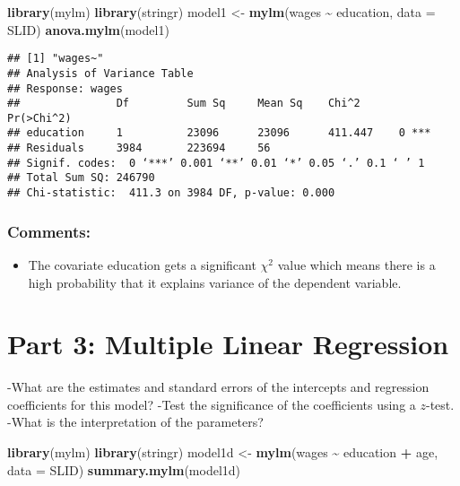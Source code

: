 \documentclass[
]{article}
\newenvironment{Shaded}{\begin{snugshade}}{\end{snugshade}}
\newcommand{\AttributeTok}[1]{\textcolor[rgb]{0.13,0.29,0.53}{#1}}
\newcommand{\FunctionTok}[1]{\textcolor[rgb]{0.13,0.29,0.53}{\textbf{#1}}}
\newcommand{\NormalTok}[1]{#1}
\newcommand{\OtherTok}[1]{\textcolor[rgb]{0.56,0.35,0.01}{#1}}
\newcommand{\SpecialCharTok}[1]{\textcolor[rgb]{0.81,0.36,0.00}{\textbf{#1}}}
\providecommand{\tightlist}{%
  \setlength{\itemsep}{0pt}\setlength{\parskip}{0pt}}
\begin{document}
\begin{Shaded}
\begin{Highlighting}[]
\FunctionTok{library}\NormalTok{(mylm)}
\FunctionTok{library}\NormalTok{(stringr)}
\NormalTok{model1 }\OtherTok{\textless{}{-}} \FunctionTok{mylm}\NormalTok{(wages }\SpecialCharTok{\textasciitilde{}}\NormalTok{ education, }\AttributeTok{data =}\NormalTok{ SLID)}
\FunctionTok{anova.mylm}\NormalTok{(model1)}
\end{Highlighting}
\end{Shaded}

\begin{verbatim}
## [1] "wages~"
## Analysis of Variance Table
## Response: wages
##               Df         Sum Sq     Mean Sq    Chi^2      Pr(>Chi^2) 
## education     1          23096      23096      411.447    0 ***      
## Residuals     3984       223694     56        
## Signif. codes:  0 ‘***’ 0.001 ‘**’ 0.01 ‘*’ 0.05 ‘.’ 0.1 ‘ ’ 1
## Total Sum SQ: 246790 
## Chi-statistic:  411.3 on 3984 DF, p-value: 0.000
\end{verbatim}

\hypertarget{comments-1}{%
\subsubsection{Comments:}\label{comments-1}}

\begin{itemize}
\tightlist
\item
  The covariate education gets a significant \(\chi^2\) value which
  means there is a high probability that it explains variance of the
  dependent variable.
\end{itemize}

\hypertarget{part-3-multiple-linear-regression}{%
\section{Part 3: Multiple Linear
Regression}\label{part-3-multiple-linear-regression}}

-What are the estimates and standard errors of the intercepts and
regression coefficients for this model? -Test the significance of the
coefficients using a \(z\)-test. -What is the interpretation of the
parameters?

\begin{Shaded}
\begin{Highlighting}[]
\FunctionTok{library}\NormalTok{(mylm)}
\FunctionTok{library}\NormalTok{(stringr)}
\NormalTok{model1d }\OtherTok{\textless{}{-}} \FunctionTok{mylm}\NormalTok{(wages }\SpecialCharTok{\textasciitilde{}}\NormalTok{ education }\SpecialCharTok{+}\NormalTok{ age, }\AttributeTok{data =}\NormalTok{ SLID)}
\FunctionTok{summary.mylm}\NormalTok{(model1d)}
\end{Highlighting}
\end{Shaded}
\end{document}

